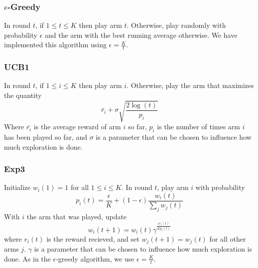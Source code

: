 \subsubsection{$\epsilon$-Greedy}
In round $t$, if $1 \leq t \leq K$ then play arm $t$.  Otherwise, play
randomly with probability $\epsilon$ and the arm with the best running
average otherwise.  We have implemented this algorithm using
$\epsilon = \frac{K}{t}$.

\subsubsection{UCB1}
In round $t$, if $1 \leq i \leq K$ then play arm $i$.  Otherwise, play
the arm that maximizes the quantity
\[
	\bar{r_i} + \sigma \sqrt{\frac{2 \log(t)}{p_i}}
\]
Where $\bar{r_i}$ is the average reward of arm $i$ so far, $p_i$ is the 
number of times arm $i$ has been played so far, and $\sigma$ is a parameter
that can be chosen to influence how much exploration is done.

\subsubsection{Exp3}
Initialize $w_i(1) = 1$ for all $1 \leq i \leq K$.  In round $t$, play
arm $i$ with probability
\[
	p_i(t) = \frac{\epsilon}{K} + (1 - \epsilon) \frac{w_i(t)}{\sum_j w_j(t)}
\]
With $i$ the arm that was played, update
\[
	w_i(t+1) = w_i(t)\gamma^{\frac{\epsilon r_i(t)}{K p_i(t)}}
\]
where $r_i(t)$ is the reward recieved, and set $w_j(t+1) = w_j(t)$ for all
other arms $j$.  $\gamma$ is a parameter that can be chosen to influence how
much exploration is done.  As in the $\epsilon$-greedy algorithm, we use
$\epsilon = \frac{K}{t}$.